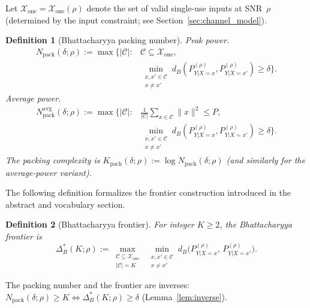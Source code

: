 \documentclass[lettersize,onecolumn]{IEEEtran}
\newtheorem{definition}{Definition}
\newcommand{\snr}{\rho}
\newcommand{\setX}{\mathcal{X}}
\newcommand{\setC}{\mathcal{C}}
\begin{document}
Let $\setX_{\mathrm{one}} = \setX_{\mathrm{one}}(\snr)$ denote the set of valid single-use
inputs at SNR~$\snr$ (determined by the input constraint;
see Section~\ref{sec:channel_model}).

\begin{definition}[Bhattacharyya packing number]\label{def:pack}
\emph{Peak power.}
\begin{equation}
\begin{split}
N_{\mathrm{pack}}(\delta;\snr) := \max\big\{|\setC| :{}
&\setC \subseteq \setX_{\mathrm{one}},\\
&\min_{\substack{x,x'\in\setC\\x\ne x'}}
d_B(P_{Y|X=x}^{(\snr)}, P_{Y|X=x'}^{(\snr)}) \ge \delta\big\}.
\end{split}
\end{equation}
\emph{Average power.}
\begin{equation}
\begin{split}
N_{\mathrm{pack}}^{\mathrm{avg}}(\delta;\snr) := \max\big\{|\setC| :{}
&\tfrac{1}{|\setC|}\!\sum_{x\in\setC}\!\|x\|^2 \le P,\\
&\min_{\substack{x,x'\in\setC\\x\ne x'}}
d_B(P_{Y|X=x}^{(\snr)}, P_{Y|X=x'}^{(\snr)}) \ge \delta\big\}.
\end{split}
\end{equation}
The packing complexity is
$K_{\mathrm{pack}}(\delta;\snr) := \log N_{\mathrm{pack}}(\delta;\snr)$
(and similarly for the average-power variant).
\end{definition}

The following definition formalizes the frontier
construction introduced in the abstract and vocabulary section.

\begin{definition}[Bhattacharyya frontier]\label{def:div_frontier}
For integer $K\ge 2$, the Bhattacharyya frontier is
\begin{equation}\label{eq:div_frontier_full}
\Delta_B^*(K;\snr) := \max_{\substack{\setC\subseteq\setX_{\mathrm{one}}\\
|\setC|=K}} \;\min_{\substack{x,x'\in\setC\\x\ne x'}}
d_B\big(P_{Y|X=x}^{(\snr)},\, P_{Y|X=x'}^{(\snr)}\big).
\end{equation}
\end{definition}

The packing number and the frontier are inverses:
$N_{\mathrm{pack}}(\delta;\snr) \ge K \Leftrightarrow
\Delta_B^*(K;\snr) \ge \delta$
(Lemma~\ref{lem:inverse}).
\end{document}
